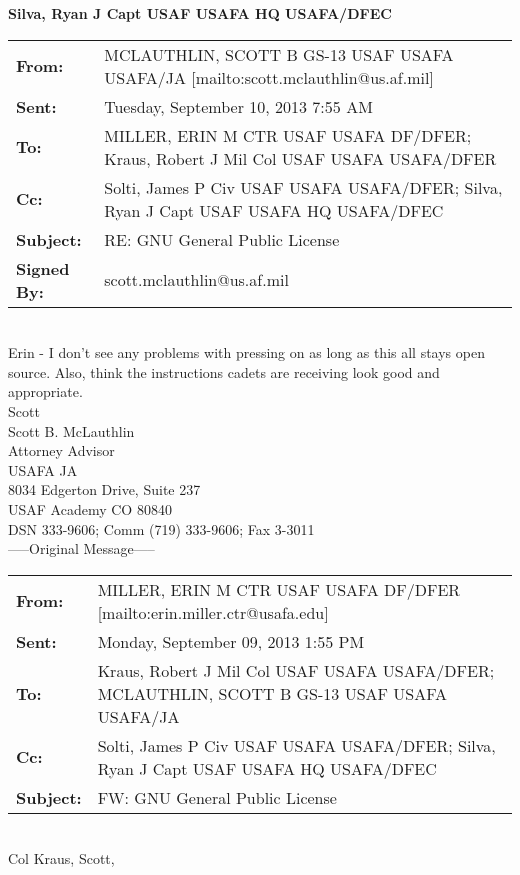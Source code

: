 \documentclass[10pt]{article}
\begin{document}
\noindent\textbf{\large{Silva, Ryan J Capt USAF USAFA HQ USAFA/DFEC}}

\noindent\makebox[\linewidth]{\rule[5mm]{\linewidth}{3.5pt}}

\noindent \begin{tabu} to \textwidth{l X[l]}

    \textbf{From:} & MCLAUTHLIN, SCOTT B GS-13 USAF USAFA USAFA/JA [mailto:scott.mclauthlin@us.af.mil]\\ 
    \textbf{Sent:} & Tuesday, September 10, 2013 7:55 AM \\
    \textbf{To:} & MILLER, ERIN M CTR USAF USAFA DF/DFER; Kraus, Robert J Mil Col USAF USAFA USAFA/DFER \\
    \textbf{Cc:} & Solti, James P Civ USAF USAFA USAFA/DFER; Silva, Ryan J Capt USAF USAFA HQ USAFA/DFEC \\
    \textbf{Subject:} & RE: GNU General Public License \\
    \textbf{Signed By:} & scott.mclauthlin@us.af.mil \\
\end{tabu}
\hspace{0pt} \\

Erin - I don't see any problems with pressing on as long as this all stays open source.  Also, think the instructions cadets are receiving look good and appropriate. \\

Scott \\

\noindent Scott B. McLauthlin \\
Attorney Advisor \\
USAFA JA \\
8034 Edgerton Drive, Suite 237 \\
USAF Academy CO 80840 \\
DSN 333-9606; Comm (719) 333-9606; Fax 3-3011 \\

\noindent-----Original Message----- \\

\noindent \begin{tabu} to \textwidth{l X[l]}

 \textbf{From:} & MILLER, ERIN M CTR USAF USAFA DF/DFER [mailto:erin.miller.ctr@usafa.edu]  \\
 \textbf{Sent:} & Monday, September 09, 2013 1:55 PM \\
 \textbf{To:} & Kraus, Robert J Mil Col USAF USAFA USAFA/DFER; MCLAUTHLIN, SCOTT B GS-13 USAF USAFA USAFA/JA \\
 \textbf{Cc:} & Solti, James P Civ USAF USAFA USAFA/DFER; Silva, Ryan J Capt USAF USAFA HQ USAFA/DFEC \\
 \textbf{Subject:} & FW: GNU General Public License \\
\end{tabu}
\hspace{0pt} \\
Col Kraus, Scott, \\
\end{document}
